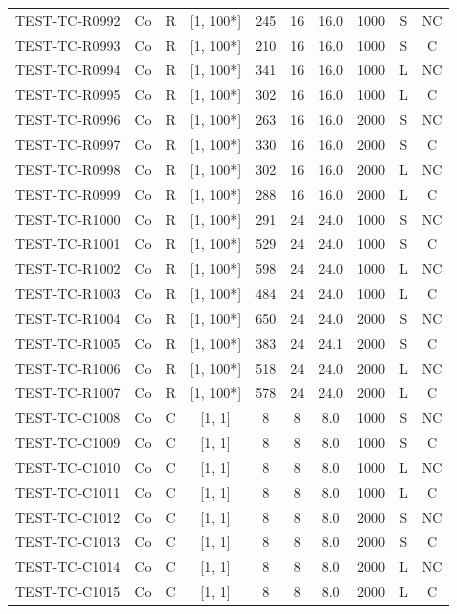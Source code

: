 \begin{longtable}{lccccccccc}
TEST-TC-R0992 & Co & R & [1, 100*] & 245 & 16 & 16.0 & 1000 & S & NC \\
TEST-TC-R0993 & Co & R & [1, 100*] & 210 & 16 & 16.0 & 1000 & S & C \\
TEST-TC-R0994 & Co & R & [1, 100*] & 341 & 16 & 16.0 & 1000 & L & NC \\
TEST-TC-R0995 & Co & R & [1, 100*] & 302 & 16 & 16.0 & 1000 & L & C \\
TEST-TC-R0996 & Co & R & [1, 100*] & 263 & 16 & 16.0 & 2000 & S & NC \\
TEST-TC-R0997 & Co & R & [1, 100*] & 330 & 16 & 16.0 & 2000 & S & C \\
TEST-TC-R0998 & Co & R & [1, 100*] & 302 & 16 & 16.0 & 2000 & L & NC \\
TEST-TC-R0999 & Co & R & [1, 100*] & 288 & 16 & 16.0 & 2000 & L & C \\
TEST-TC-R1000 & Co & R & [1, 100*] & 291 & 24 & 24.0 & 1000 & S & NC \\
TEST-TC-R1001 & Co & R & [1, 100*] & 529 & 24 & 24.0 & 1000 & S & C \\
TEST-TC-R1002 & Co & R & [1, 100*] & 598 & 24 & 24.0 & 1000 & L & NC \\
TEST-TC-R1003 & Co & R & [1, 100*] & 484 & 24 & 24.0 & 1000 & L & C \\
TEST-TC-R1004 & Co & R & [1, 100*] & 650 & 24 & 24.0 & 2000 & S & NC \\
TEST-TC-R1005 & Co & R & [1, 100*] & 383 & 24 & 24.1 & 2000 & S & C \\
TEST-TC-R1006 & Co & R & [1, 100*] & 518 & 24 & 24.0 & 2000 & L & NC \\
TEST-TC-R1007 & Co & R & [1, 100*] & 578 & 24 & 24.0 & 2000 & L & C \\
TEST-TC-C1008 & Co & C & [1, 1] & 8 & 8 & 8.0 & 1000 & S & NC \\
TEST-TC-C1009 & Co & C & [1, 1] & 8 & 8 & 8.0 & 1000 & S & C \\
TEST-TC-C1010 & Co & C & [1, 1] & 8 & 8 & 8.0 & 1000 & L & NC \\
TEST-TC-C1011 & Co & C & [1, 1] & 8 & 8 & 8.0 & 1000 & L & C \\
TEST-TC-C1012 & Co & C & [1, 1] & 8 & 8 & 8.0 & 2000 & S & NC \\
TEST-TC-C1013 & Co & C & [1, 1] & 8 & 8 & 8.0 & 2000 & S & C \\
TEST-TC-C1014 & Co & C & [1, 1] & 8 & 8 & 8.0 & 2000 & L & NC \\
TEST-TC-C1015 & Co & C & [1, 1] & 8 & 8 & 8.0 & 2000 & L & C \\

\end{longtable}
